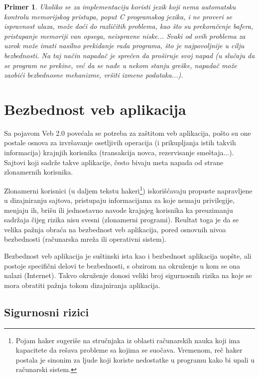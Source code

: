 \documentclass[a4paper]{article}
\newtheorem{primer}{Primer}[section]
\begin{document}
\begin{primer}
	\label{primer5}
	Ukoliko se za implementaciju koristi jezik koji nema automatsku kontrolu memorijskog pristupa, poput C programskog jezika, i ne proveri se ispravnost ulaza, može doći do različitih problema, kao što su prekoračenje bafera, pristupanje memoriji van opsega, neispravne niske... Svaki od ovih problema za uzrok može imati nasilno prekidanje rada programa, što je najpovoljnije u cilju bezbednosti. Na taj način napadač je sprečen da proširuje svoj napad (u slučaju da se program ne prekine, već da se nađe u nekom stanju greške, napadač može zaobići bezbednosne mehanizme, vršiti izmene podataka...).
\end{primer}

\section{Bezbednost veb aplikacija} \label{aplikacije}

Sa pojavom Veb 2.0 \cite{VEB} povećala se potreba za zaštitom veb aplikacija, pošto su one postale osnova za izvršavanje osetljivih operacija (i prikupljanja istih takvih informacija) krajnjih korisnika (transakcija novca, rezervisanje smeštaja...). Sajtovi koji sadrže takve aplikacije, često bivaju meta napada od strane zlonamernih korisnika.

Zlonamerni korisnici (u daljem tekstu hakeri\footnote{Pojam haker sugeriše na stručnjaka iz oblasti računarskih nauka koji ima kapacitete da rešava probleme sa kojima se suočava. Vremenom, reč haker postala je sinonim za ljude koji koriste nedostatke u programu kako bi upali u računarski sistem.}) iskorišćavaju propuste napravljene u dizajniranju sajtova, pristupaju informacijama za koje nemaju privilegije, menjaju ih, brišu ili jednostavno navode krajnjeg korisnika ka preuzimanju sadržaja čijeg rizika nisu svesni (zlonamerni programi). Reultat toga je da se velika pažnja obraća na bezbednost veb aplikacija, pored osnovnih nivoa bezbednosti (računarska mreža ili operativni sistem).

Bezbednost veb aplikacija je suštinski ista kao i bezbednost aplikacija uopšte, ali postoje specifični delovi te bezbednosti, s obzirom na okruženje u kom se ona nalazi (Internet). Takvo okruženje donosi veliki broj sigurnosnih rizika na koje se mora obratiti pažnja tokom dizajniranja aplikacija.

\subsection{Sigurnosni rizici}
\end{document}
